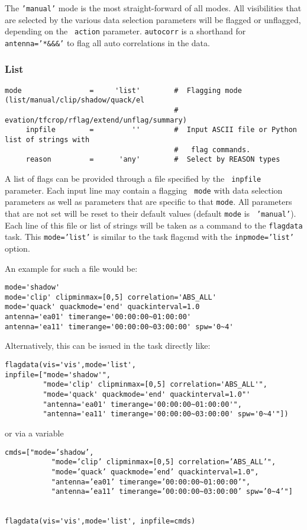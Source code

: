 The {\tt 'manual'} mode is the most straight-forward of all modes. All
visibilities that are selected by the various data selection
parameters will be flagged or unflagged, depending on the {\tt
  action} parameter. {\tt autocorr} is a shorthand for {\tt
  antenna='*\&\&\&'} to flag all auto correlations in the data.


\subsubsection{List}
\label{section:edit.flagdata.mode.list}


\small
\begin{verbatim}
mode                =     'list'        #  Flagging mode (list/manual/clip/shadow/quack/el
                                        #   evation/tfcrop/rflag/extend/unflag/summary)
     inpfile        =         ''        #  Input ASCII file or Python list of strings with
                                        #   flag commands.
     reason         =      'any'        #  Select by REASON types
\end{verbatim}
\normalsize

A list of flags can be provided through a file specified by the {\tt
  inpfile} parameter.  Each input line may contain a flagging {\tt
  mode} with data selection parameters as well as parameters that are
specific to that {\tt mode}. All parameters that are not set will be
reset to their default values (default {\tt mode} is {\tt
  'manual'}). Each line of this file or list of strings will be taken
as a command to the {\tt flagdata} task. This {\tt mode=’list’} is similar to the
task flagcmd with the {\tt inpmode=’list’} option. 

An example for such a file would be: 

\small
\begin{verbatim}
mode='shadow'
mode='clip' clipminmax=[0,5] correlation='ABS_ALL'
mode='quack' quackmode='end' quackinterval=1.0
antenna='ea01' timerange='00:00:00~01:00:00'
antenna='ea11' timerange='00:00:00~03:00:00' spw='0~4'
\end{verbatim}
\normalsize

Alternatively, this can be issued in the task directly like:

\small
\begin{verbatim}
flagdata(vis='vis',mode='list',
inpfile=["mode='shadow'",
         "mode='clip' clipminmax=[0,5] correlation='ABS_ALL'",
         "mode='quack' quackmode='end' quackinterval=1.0"'
         "antenna='ea01' timerange='00:00:00~01:00:00'",
         "antenna='ea11' timerange='00:00:00~03:00:00' spw='0~4'"])
\end{verbatim}
\normalsize
or via a variable
\small
\begin{verbatim}
cmds=["mode=’shadow’,
           "mode=’clip’ clipminmax=[0,5] correlation=’ABS_ALL’",
           "mode=’quack’ quackmode=’end’ quackinterval=1.0",
           "antenna=’ea01’ timerange=’00:00:00~01:00:00’",
           "antenna=’ea11’ timerange=’00:00:00~03:00:00’ spw=’0~4’"]


flagdata(vis='vis',mode='list', inpfile=cmds)
\end{verbatim}
\normalsize

